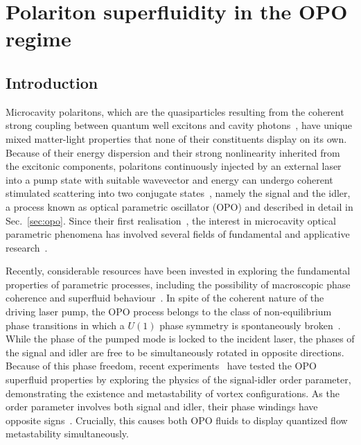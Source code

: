 

\chapter{Polariton superfluidity in the OPO regime}
\label{cha:opo}

\section{Introduction}
%
Microcavity polaritons, which are the quasiparticles resulting from
the coherent strong coupling between quantum well excitons and cavity
photons~\cite{9780199228942}, have unique mixed matter-light
properties that none of their constituents display on its own. Because
of their energy dispersion and their strong nonlinearity inherited
from the excitonic components, polaritons continuously injected by an
external laser into a pump state with suitable wavevector and energy
can undergo coherent stimulated scattering into two conjugate
states~\cite{Ciuti_2000,Ciuti_2001,Ciuti_2003}, namely the signal and
the idler, a process known as optical parametric oscillator (OPO) and
described in detail in Sec.~\ref{sec:opo}.
%
Since their first
realisation~\cite{Stevenson_2000,Savvidis_2000,Savvidis_2000_b,Baumberg_2000,Saba_2001},
the interest in microcavity optical parametric phenomena has involved
several fields of fundamental and applicative
research~\cite{Edamatsu_2004,Savasta_2005,Lanco_2006,Abbarchi_2011,Ardizzone_2012,Xie_2012,Lecomte_2013}.

Recently, considerable resources have been invested in exploring the
fundamental properties of parametric processes, including the
possibility of macroscopic phase coherence and superfluid
behaviour~\cite{Carusotto_2013}.
%
In spite of the coherent nature of the driving laser pump, the OPO
process belongs to the class of non-equilibrium phase transitions in
which a $U(1)$ phase symmetry is spontaneously
broken~\cite{Wouters_2007}.
%
While the phase of the pumped mode is locked to the incident laser,
the phases of the signal and idler are free to be simultaneously rotated in
opposite directions.
%
Because of this phase freedom, recent experiments~\cite{Sanvitto_2010}
have tested the OPO superfluid properties by exploring the physics of
the signal-idler order parameter, demonstrating the existence and
metastability of vortex configurations. As the order parameter
involves both signal and idler, their phase windings have opposite
signs~\cite{Sanvitto_2010,Marchetti_2010,9783642241857}.  Crucially, this
causes both OPO fluids to display quantized flow metastability
simultaneously.

